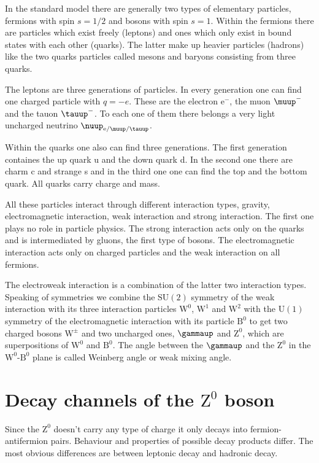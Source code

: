 \documentclass[11pt, english, fleqn, DIV=15, headinclude, BCOR=2cm]{scrreprt}
\begin{document}
In the standard model there are generally two types of elementary particles,
fermions with spin $s = 1/2$ and bosons with spin $s = 1$. Within the fermions
there are particles which exist freely (leptons) and ones which only exist in
bound states with each other (quarks). The latter make up heavier particles
(hadrons) like the two quarks particles called mesons and baryons consisting
from three quarks. 

The leptons are three generations of particles. In every
generation one can find one charged particle with $q = -e$. These are the
electron $\mathrm e^-$, the muon $\muup^-$ and the tauon $\tauup^-$. To each
one of them there belongs a very light uncharged neutrino
$\nuup_{\mathrm{e}/\muup/\tauup}$.

Within the quarks one also can find three generations. The first generation
containes the up quark u and the down quark d. In the second one there are
charm c and strange s and in the third one one can find the top and the bottom
quark. All quarks carry charge and mass.

All these particles interact through different interaction types, gravity,
electromagnetic interaction, weak interaction and strong interaction. The first
one plays no role in particle physics. The strong interaction acts only on the
quarks and is intermediated by gluons, the first type of bosons. The
electromagnetic interaction acts only on charged particles and the weak
interaction on all fermions. 

The electroweak interaction is a combination of the latter two interaction
types. Speaking of symmetries we combine the $\mathrm{SU}(2)$ symmetry of the
weak interaction with its three interaction particles $\mathrm W^0$, $\mathrm
W^1$ and $\mathrm W^2$ with the $\mathrm U(1)$ symmetry of the electromagnetic
interaction with its particle $\mathrm B^0$ to get two charged bosons $\mathrm
W^\pm$ and two uncharged ones, $\gammaup$ and $\mathrm Z^0$, which are
superpositions of $\mathrm W^0$ and $\mathrm B^0$. The angle between the
$\gammaup$ and the $\mathrm Z^0$ in the $\mathrm W^0$-$\mathrm B^0$ plane is
called Weinberg angle or weak mixing angle.

\section{Decay channels of the $\mathrm Z^0$ boson}

Since the $\mathrm Z^0$ doesn't carry any type of charge it only decays into
fermion-antifermion pairs. Behaviour and properties of possible decay products
differ. The most obvious differences are between leptonic decay and hadronic
decay.
\end{document}
